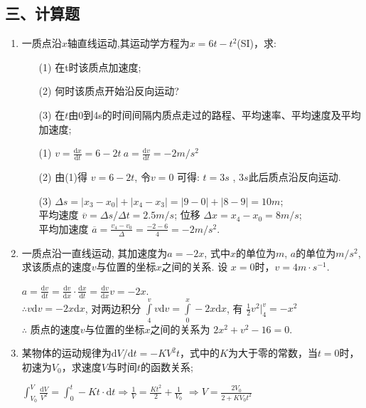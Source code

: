 \subsection*{三、计算题}
\begin{enumerate}
    \item 一质点沿$x$轴直线运动,其运动学方程为$x=6t-t^2$(SI)，求:
    \begin{enumerate}
        \item[(1)] 在t时该质点加速度;
        \item[(2)] 何时该质点开始沿反向运动?
        \item[(3)] 在$t$由0到4s的时间间隔内质点走过的路程、平均速率、平均速度及平均加速度;
    \end{enumerate}
    \begin{solution}
        \begin{enumerate}
            \item[(1)]  $v=\frac{\mathrm{d}x}{\mathrm{d}t}=6-2t\ a=\frac{\mathrm{d}v}{\mathrm{d}t}=-2 m/s^2$
            \item[(2)]  由(1)得 $v=6-2t$, 令$v=0$ 可得: $t=3s$ , $3s$此后质点沿反向运动.
            \item[(3)]  $\Delta s = |x_3-x_0|+|x_4-x_3|=|9-0|+|8-9|=10 m $; \\
                    平均速度 $\overline{v}=\Delta s/ \Delta t=2.5 m/s$; 位移 $\Delta x = x_4-x_0=8 m/s$;
                    \\平均加速度 $\overline{a}=\frac{v_4-v_0}{\Delta}=\frac{-2-6}{4}=-2 m/s^2$.
        
        \end{enumerate}
       
    \end{solution}
    \item 一质点沿一直线运动, 其加速度为$a=-2x$, 式中$x$的单位为$m$, $a$的单位为$m/s^2$, 
    求该质点的速度$v$与位置的坐标$x$之间的关系. 设 $x=0$时，$v=4m\cdot s^{-1}$.
    \begin{solution}
        $a=\frac{\mathrm{d}v}{\mathrm{d}t}=\frac{\mathrm{d}v}{\mathrm{d}x}\cdot \frac{\mathrm{d}x}{\mathrm{d}t}=\frac{\mathrm{d}v}{\mathrm{d}x}v=-2x$. \\
        $\therefore v\mathrm{d}v = -2x\mathrm{d}x$, 对两边积分 $\displaystyle{\int\limits_4^v v\mathrm{d}v = \int\limits_0^x -2x \mathrm{d}x}$, 有 $\frac{1}{2}v^2 |_4^v = -x^2$\\
        $\therefore$ 质点的速度$v$与位置的坐标$x$之间的关系为 $2x^2+v^2-16 = 0$.
    \end{solution}
    \item  某物体的运动规律为$\mathrm{d}V/\mathrm{d}t=-KV^2t$，式中的$K$为大于零的常数，当$t=0$时，初速为$V_0$，求速度$V$与时间$t$的函数关系; 
    \begin{solution}
        $\displaystyle{\int_{V_0}^{V}\frac{\mathrm{d}V}{V^2}=\int_{0}^{t} -Kt \cdot \mathrm{d}t\Longrightarrow \frac{1}{V} = \frac{Kt^2}{2}+\frac{1}{V_0}}$
        $\Longrightarrow V=\frac{2V_0}{2+KV_0t^2}$
    \end{solution}
\end{enumerate}